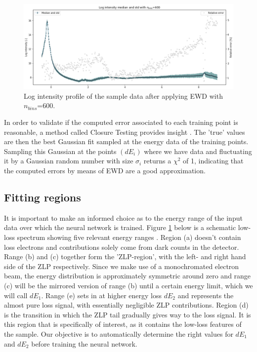 \documentclass[11pt,a4paper]{article}
\numberwithin{equation}{section}
\numberwithin{figure}{section}
\numberwithin{table}{section}
\begin{document}
\begin{figure}[H]
    \centering
    \includegraphics[width=155mm]{plots/ewd.png}
    \caption{Log intensity profile of the sample data after applying EWD with $n_{bins}$=600.}
    \label{ranges}
\end{figure}


In order to validate if the computed error associated to each training point is reasonable, a method called Closure Testing provides insight \cite{closure}.  The 'true' values are then the best Gaussian fit sampled at the energy data of the training points. Sampling this Gaussian at the points $(dE_i)$ where we have data and fluctuating it by a Gaussian random number with size $\sigma_i$ returns a $\chi^2$ of 1, indicating that the computed errors by means of EWD are a good approximation.


\subsection{Fitting regions}
It is important to make an informed choice as to the energy range of the input data over which the neural network is trained. Figure \ref{ranges} below is a schematic low-loss spectrum showing five relevant energy ranges \cite{reed}. Region (a) doesn't contain loss electrons and contributions solely come from dark counts in the detector. Range (b) and (c) together form the 'ZLP-region', with the left- and right hand side of the ZLP respectively. Since we make use of a monochromated electron beam, the energy distribution is approximately symmetric around zero and range (c) will be the mirrored version of range (b) until a certain energy limit, which we will call $dE_1$. Range (e) sets in at higher energy loss $dE_2$ and represents the almost pure loss signal, with essentially negligible ZLP contributions. Region (d) is the transition in which the ZLP tail gradually gives way to the loss signal. It is this region that is specifically of interest, as it contains the low-loss features of the sample.  Our objective is to automatically determine the right values for $dE_1$ and $dE_2$ before training the neural network.
\end{document}
